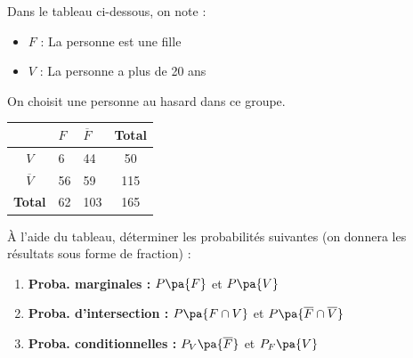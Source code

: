 \begin{exo}
	Dans le tableau ci-dessous, on note :
	\begin{itemize}
		\item $F$ : \og{} La personne est une fille \fg{}
		\item $V$ : \og{} La personne a plus de 20 ans \fg{}
	\end{itemize}

	On choisit une personne au hasard dans ce groupe.

	\begin{center}
		\renewcommand{\arraystretch}{1.2}
		\begin{tabular}{|c|C{2cm}|C{2cm}|c|}
			\hline
			               & $F$ & $\overline{F}$ & \textbf{Total} \\ \hline
			$V$            & 6   & 44             & 50             \\ \hline
			$\overline{V}$ & 56  & 59             & 115            \\ \hline
			\textbf{Total} & 62  & 103            & 165            \\ \hline
		\end{tabular}
	\end{center}

	À l'aide du tableau, déterminer les probabilités suivantes (on donnera les résultats sous forme de fraction) :

	\begin{enumerate}
		\item \textbf{Proba. marginales :} $P\pa{F}$ et $P\pa{V}$
		\item \textbf{Proba. d'intersection :} $P\pa{F \cap V}$ et $P\pa{\overline{F} \cap \overline{V}}$
		\item \textbf{Proba. conditionnelles :} $P_{V}\pa{\overline{F}}$ et $P_{F}\pa{V}$
	\end{enumerate}
\end{exo}
